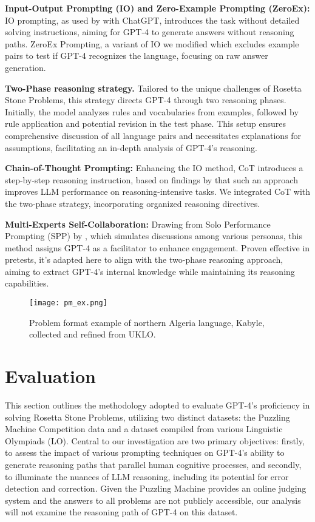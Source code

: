 \documentclass[10pt, a4paper]{article}
\begin{document}
\textbf{Input-Output Prompting (IO) and Zero-Example Prompting (ZeroEx):}
IO prompting, as used by \citet{PuzzGPT} with ChatGPT, introduces the task without detailed solving instructions, aiming for GPT-4 to generate answers without reasoning paths. ZeroEx Prompting, a variant of IO we modified which excludes example pairs to test if GPT-4 recognizes the language, focusing on raw answer generation. 

\textbf{Two-Phase reasoning strategy.} Tailored to the unique challenges of Rosetta Stone Problems, this strategy directs GPT-4 through two reasoning phases. Initially, the model analyzes rules and vocabularies from examples, followed by rule application and potential revision in the test phase. This setup ensures comprehensive discussion of all language pairs and necessitates explanations for assumptions, facilitating an in-depth analysis of GPT-4’s reasoning.

\textbf{Chain-of-Thought Prompting:}
Enhancing the IO method, CoT introduces a step-by-step reasoning instruction, based on findings by \citet{CoT} that such an approach improves LLM performance on reasoning-intensive tasks. We integrated CoT with the two-phase strategy, incorporating organized reasoning directives.

\textbf{Multi-Experts Self-Collaboration:} 
Drawing from Solo Performance Prompting (SPP) by \citet{SPP}, which simulates discussions among various personas, this method assigns GPT-4 as a facilitator to enhance engagement. Proven effective in pretests, it's adapted here to align with the two-phase reasoning approach, aiming to extract GPT-4’s internal knowledge while maintaining its reasoning capabilities.


\begin{figure}[htp]
    \centering
    \texttt{[image: pm\_ex.png]}
    \caption{Problem format example of northern Algeria language, Kabyle, collected and refined from UKLO.}
    \label{pm_ex}
\end{figure}

\section{Evaluation}
This section outlines the methodology adopted to evaluate GPT-4's proficiency in solving Rosetta Stone Problems, utilizing two distinct datasets: the Puzzling Machine Competition data and a dataset compiled from various Linguistic Olympiads (LO). Central to our investigation are two primary objectives: firstly, to assess the impact of various prompting techniques on GPT-4's ability to generate reasoning paths that parallel human cognitive processes, and secondly, to illuminate the nuances of LLM reasoning, including its potential for error detection and correction. Given the Puzzling Machine provides an online judging system and the answers to all problems are not publicly accessible, our analysis will not examine the reasoning path of GPT-4 on this dataset. 
\end{document}
